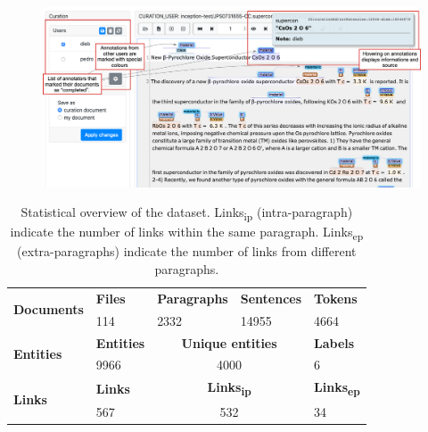 \documentclass[fleqn,10pt]{wlscirep}
\begin{document}
\begin{figure}[htb]
    \centering
    \includegraphics[width=\linewidth]{inception-curation-new.png}
    \label{fig:inception-curation-interface}
\end{figure}

\begin{table}[ht]
    \centering
    \begin{tabular}{ |m{6em}  | m{4em} | m{6em} | m{7em} | m{6em} |} 
    \hline
        \multirow{2}{5em}{\textbf{Documents}} & \textbf{Files} & \textbf{Paragraphs} &	\textbf{Sentences} & \textbf{Tokens}\\
         & 114  &	2332 & 	14955 & 	4664\\
    \hline\hline
        \multirow{2}{5em}{\textbf{Entities}} & \textbf{Entities} &  \multicolumn{2}{|c|}{\textbf{Unique entities}} &  \textbf{ Labels} \\
        & 9966 &  \multicolumn{2}{|c|}{4000} &  6 \\
    \hline\hline
        \multirow{2}{5em}{\textbf{Links}} & \textbf{Links} & \multicolumn{2}{|c|}{\textbf{Links\textsubscript{ip}}} 
        & \textbf{Links\textsubscript{ep}}\\
        & 567  & \multicolumn{2}{|c|}{532}&	34	\\
    \hline
    \end{tabular}
    \caption{Statistical overview of the dataset. 
    Links\textsubscript{ip} (intra-paragraph) indicate the number of links within the same paragraph. Links\textsubscript{ep} (extra-paragraphs) indicate the number of links from different paragraphs.  }
    \label{table:summary-content}
\end{table}
\end{document}

